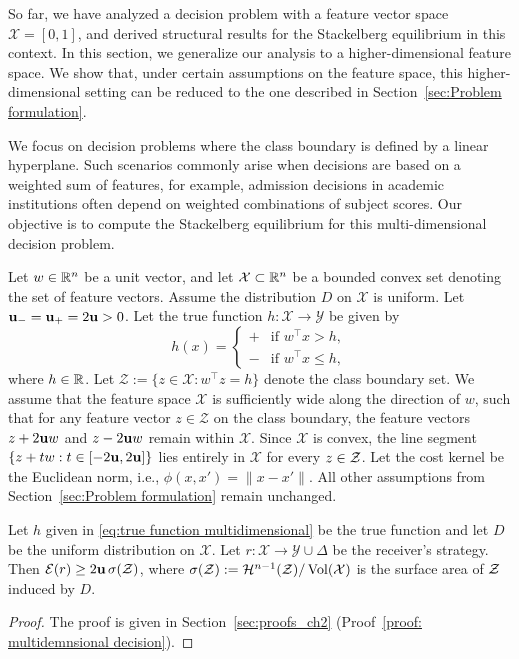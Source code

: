 So far, we have analyzed a decision problem with a feature vector space $\mathcal{X} = [0,1]$, and derived structural results for the Stackelberg equilibrium in this context. In this section, we generalize our analysis to a higher-dimensional feature space. We show that, under certain assumptions on the feature space, this higher-dimensional setting can be reduced to the one described in Section~\ref{sec:Problem formulation}.

We focus on decision problems where the class boundary is defined by a linear hyperplane. Such scenarios commonly arise when decisions are based on a weighted sum of features, for example, admission decisions in academic institutions often depend on weighted combinations of subject scores. Our objective is to compute the Stackelberg equilibrium for this multi-dimensional decision problem.

Let $w \in \mathbb{R}^n$ be a unit vector, and let $\mathcal{X} \subset \mathbb{R}^n$ be a bounded convex set denoting the set of feature vectors. Assume the distribution $D$ on $\mathcal{X}$ is uniform. Let $\mathbf{u_-} = \mathbf{u_+} = 2\mathbf{u} > 0$. Let the true function $h: \mathcal{X} \to \mathcal{Y}$ be given by
\begin{equation}\label{eq:true function multidimensional}
    h(x) = \begin{cases}
        \plus & \text{if } w^\top x > h, \\
        \minus & \text{if } w^\top x \leq h,
    \end{cases}
\end{equation}
where $h \in \mathbb{R}$.
Let $\mathcal{Z} := \{z \in \mathcal{X} : w^\top z = h\}$ denote the class boundary set. We assume that the feature space $\mathcal{X}$ is sufficiently wide along the direction of $w$, such that for any feature vector $z \in \mathcal{Z}$ on the class boundary, the feature vectors $z + 2\mathbf{u} w$ and $z - 2\mathbf{u} w$ remain within $\mathcal{X}$. Since $\mathcal{X}$ is convex, the line segment $\{z + tw : t \in [-2\mathbf{u}, 2\mathbf{u}]\}$ lies entirely in $\mathcal{X}$ for every $z \in \mathcal{Z}$.
Let the cost kernel be the Euclidean norm, i.e., $\phi(x, x') = \|x - x'\|$. All other assumptions from Section~\ref{sec:Problem formulation} remain unchanged.

\begin{thm}\label{thm: multidimension decision problem}
    Let $h$ given in \eqref{eq:true function multidimensional} be the true function and let $D$ be the uniform distribution on $\mathcal{X}$. Let
    $r: \mathcal{X} \rightarrow \mathcal{Y} \cup \Delta$ be the receiver's strategy. Then $\mathcal{E}(r) \geq 2\mathbf{u}\,\sigma(\mathcal{Z})$, where $\sigma(\mathcal{Z}) := \mathcal{H}^{n-1}(\mathcal{Z})/\operatorname{Vol}(\mathcal{X})$ is the surface area of $\mathcal{Z}$ induced by $D$.
\end{thm}
\begin{proof}
    The proof is given in Section~\ref{sec:proofs_ch2} (Proof~\ref{proof: multidemnsional decision}).
\end{proof}

